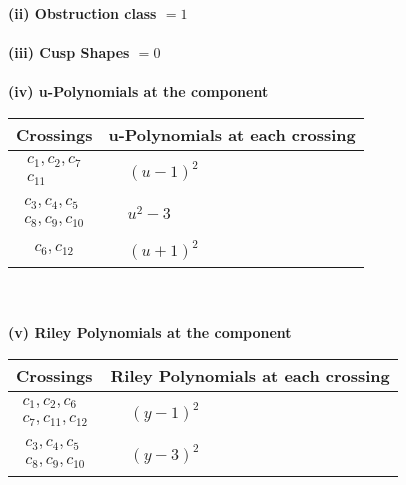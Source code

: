 \documentclass[1p]{elsarticle_modified}
\theoremstyle{definition}
\begin{document}
\flushleft \textbf{(ii) Obstruction class $= 1$}\\~\\
\flushleft \textbf{(iii) Cusp Shapes $= 0$}\\~\\
\newpage\renewcommand{\arraystretch}{1}
\flushleft \textbf{(iv) u-Polynomials at the component}\newline \\
\begin{tabular}{m{50pt}|m{274pt}}
Crossings & \hspace{64pt}u-Polynomials at each crossing \\
\hline $$\begin{aligned}c_{1},c_{2},c_{7}\\c_{11}\end{aligned}$$&$\begin{aligned}
&(u-1)^2
\end{aligned}$\\
\hline $$\begin{aligned}c_{3},c_{4},c_{5}\\c_{8},c_{9},c_{10}\end{aligned}$$&$\begin{aligned}
&u^2-3
\end{aligned}$\\
\hline $$\begin{aligned}c_{6},c_{12}\end{aligned}$$&$\begin{aligned}
&(u+1)^2
\end{aligned}$\\
\hline
\end{tabular}\\~\\
\newpage\renewcommand{\arraystretch}{1}
\flushleft \textbf{(v) Riley Polynomials at the component}\newline \\
\begin{tabular}{m{50pt}|m{274pt}}
Crossings & \hspace{64pt}Riley Polynomials at each crossing \\
\hline $$\begin{aligned}c_{1},c_{2},c_{6}\\c_{7},c_{11},c_{12}\end{aligned}$$&$\begin{aligned}
&(y-1)^2
\end{aligned}$\\
\hline $$\begin{aligned}c_{3},c_{4},c_{5}\\c_{8},c_{9},c_{10}\end{aligned}$$&$\begin{aligned}
&(y-3)^2
\end{aligned}$\\
\hline
\end{tabular}\\~\\
\end{document}
